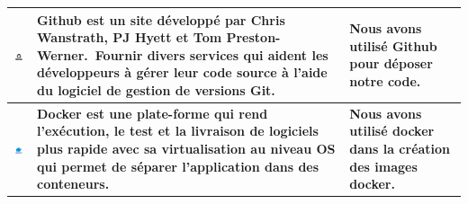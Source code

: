 \begin{center}
\begin{table}[H]
\begin{tabular}{|m{5cm}|m{5cm}|m{5cm}|}
  \hline
  \centering\includegraphics[width=2cm,valign=c]{autre_partie/GitHub-Logo.png}& \textbf{Github est un site développé par Chris Wanstrath, PJ Hyett et Tom Preston-Werner. Fournir divers services qui aident les développeurs à gérer leur code source à l'aide du logiciel de gestion de versions Git.} & \textbf{Nous avons utilisé Github pour déposer notre code.}  \\
  \hline
  \centering\includegraphics[width=2cm,valign=c]{autre_partie/Docker-Symbol.png}& \textbf{Docker est une plate-forme qui rend l’exécution, le test et la livraison de logiciels plus rapide avec sa virtualisation au niveau OS qui permet de séparer l’application dans des conteneurs.} &\textbf{Nous avons utilisé docker dans la création des images docker.}\\
  \hline

  \end{tabular}
  \end{table}
  \end{center}
  \newpage
